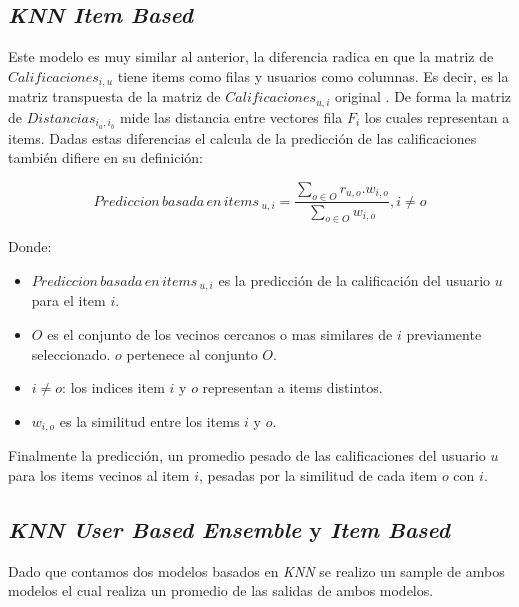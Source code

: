 \documentclass[11pt,a4paper,twoside]{thesis}
\begin{document}
\subsection{\textit{KNN Item Based}}

Este modelo es muy similar al anterior, la diferencia radica en que la matriz
de $Calificaciones_{i, u}$ tiene items como filas y usuarios como columnas. Es
decir, es la matriz transpuesta de la matriz de $Calificaciones_{u, i}$
original \cite{useritembasedinference}. De forma la matriz de
$Distancias_{i_a,i_b}$ mide las distancia entre vectores fila $F_i$ los cuales
representan a items. Dadas estas diferencias el calcula de la predicción de las
calificaciones también difiere en su definición:

\begin{equation}
	Prediccion \mspace{3mu}basada \mspace{3mu}en \mspace{3mu}items\mspace{3mu}_{u, i} = \frac{\sum_{o \in O} r_{u, o}. w_{i, o} }{\sum_{o \in O} w_{i, o} }, i \neq o
\end{equation}
\begin{description}
	\item[Donde:]
\end{description}
\begin{itemize}
	\item $Prediccion \mspace{3mu}basada \mspace{3mu}en \mspace{3mu}items\mspace{3mu}_{u, i}$ es la predicción de la calificación del usuario $u$ para el item $i$.
	\item $O$ es el conjunto de los vecinos cercanos o mas similares de $i$ previamente seleccionado. $o$ pertenece al conjunto $O$.
	\item $i \neq o$: los indices item $i$ y $o$ representan a items distintos.
	\item $w_{i,o}$ es la similitud entre los items $i$ y $o$.
\end{itemize}

Finalmente la predicción, un promedio pesado de las calificaciones del usuario
$u$ para los items vecinos al item $i$, pesadas por la similitud de cada item
$o$ con $i$.

\subsection{\textit{KNN User Based Ensemble} y \textit{Item Based}}

Dado que contamos dos modelos basados en \textit{KNN} se realizo un sample de
ambos modelos el cual realiza un promedio de las salidas de ambos modelos.
\end{document}

